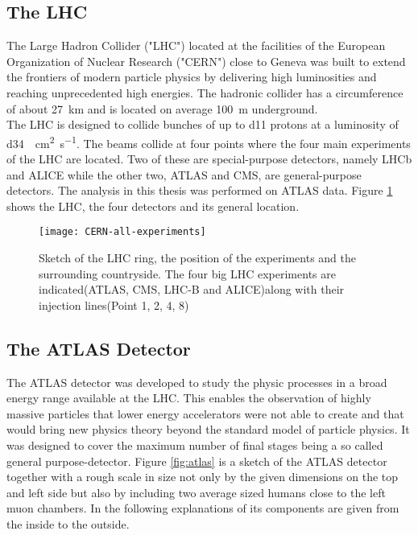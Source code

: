 \subsection{The LHC}

The Large Hadron Collider ("LHC") located at the facilities of the European Organization of Nuclear Research ("CERN") close to Geneva was built to extend the frontiers of modern particle physics by delivering high luminosities and reaching unprecedented high energies. The hadronic collider has a circumference of about \SI{27}{\km} and is located on average \SI{100}{\meter} underground.\\
The LHC is designed to collide bunches of up to \num{d11} protons at a luminosity of \SI{d34}{\per\square\cm \per\s}. The beams collide at four points where the four main experiments of the LHC are located. Two of these are special-purpose detectors, namely LHCb and ALICE while the other two, ATLAS and CMS, are general-purpose detectors.
The analysis in this thesis was performed on ATLAS data.
Figure \ref{fig:LHC} shows the LHC, the four detectors and its general location.
\begin{figure}[h]
  \centering
  \texttt{[image: CERN-all-experiments]}
  \caption[Sketch of the LHC ring, the position of the experiments and
  the surrounding countryside.]{Sketch of the LHC ring, the position
    of the experiments and the surrounding countryside. The four big
    LHC experiments are indicated(ATLAS, CMS, LHC-B and ALICE)along with their injection lines(Point 1, 2, 4, 8)\cite{atlasfigures}}
  \label{fig:LHC}
\end{figure}


\subsection{The ATLAS Detector}

The ATLAS detector was developed to study the physic processes in a broad energy range available at the LHC. This enables the observation of highly massive particles that lower energy accelerators were not able to create and that would bring new physics theory beyond the standard model of particle physics.
It was designed to cover the maximum number of final stages being a so called general purpose-detector.
Figure \ref{fig:atlas} is a sketch of the ATLAS detector together with a rough scale in size not only by the given dimensions on the top and left side but also by including two average sized humans close to the left muon chambers. In the following explanations of its components are given from the inside to the outside.

